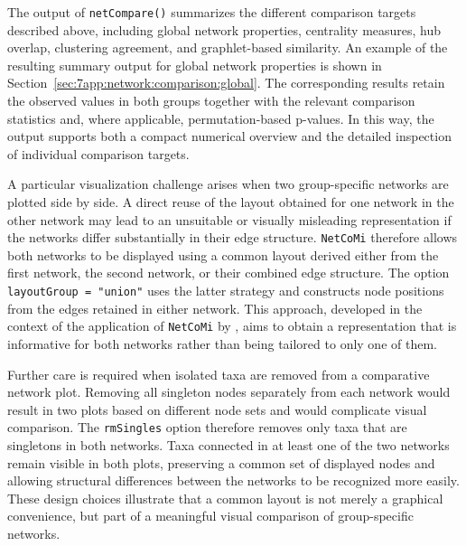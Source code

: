 The output of \texttt{netCompare()} summarizes the different comparison targets described above, including global network properties, centrality measures, hub overlap, clustering agreement, and graphlet-based similarity. An example of the resulting summary output for global network properties is shown in Section~\ref{sec:7app:network:comparison:global}. The corresponding results retain the observed values in both groups together with the relevant comparison statistics and, where applicable, permutation-based p-values. In this way, the output supports both a compact numerical overview and the detailed inspection of individual comparison targets.

A particular visualization challenge arises when two group-specific networks are plotted side by side. A direct reuse of the layout obtained for one network in the other network may lead to an unsuitable or visually misleading representation if the networks differ substantially in their edge structure. \texttt{NetCoMi} therefore allows both networks to be displayed using a common layout derived either from the first network, the second network, or their combined edge structure. The option \texttt{layoutGroup = "union"} uses the latter strategy and constructs node positions from the edges retained in either network. This approach, developed in the context of the application of \texttt{NetCoMi} by \citet{sommer2022randomizationbased}, aims to obtain a representation that is informative for both networks rather than being tailored to only one of them.

Further care is required when isolated taxa are removed from a comparative network plot. Removing all singleton nodes separately from each network would result in two plots based on different node sets and would complicate visual comparison. The \texttt{rmSingles} option therefore removes only taxa that are singletons in both networks. Taxa connected in at least one of the two networks remain visible in both plots, preserving a common set of displayed nodes and allowing structural differences between the networks to be recognized more easily. These design choices illustrate that a common layout is not merely a graphical convenience, but part of a meaningful visual comparison of group-specific networks.

